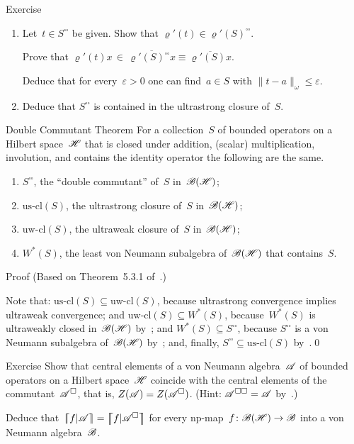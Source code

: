 \documentclass[a]{subfiles}
\begin{document}
\begin{parsec}
\begin{point}{Exercise}
\begin{point}
\begin{enumerate}
\item
Let~$t\in S^{\square\square}$ be given.
Show that $\varrho'(t)\in \varrho'(S)^{\square\square}$.

Prove that  $\varrho'(t)x\,\in\,\overline{\varrho'(S)^{\square\square}x}
\equiv \overline{\varrho'(S)x}$.

Deduce
that for every~$\varepsilon>0$
one can find~$a\in S$ with $\|t-a\|_\omega \leq \varepsilon$.

\item
Deduce that $S^{\square\square}$
is contained in the ultrastrong closure of~$S$.
\end{enumerate}
\end{point}
\end{point}
\begin{point}{Double Commutant Theorem}%
For a collection~$S$ of bounded operators
on a Hilbert space~$\mathscr{H}$
that is closed under addition, (scalar) multiplication,
involution, and contains the identity operator
the following are the same.
\begin{enumerate}
\item
$S^{\square\square}$, the ``double commutant'' of~$S$
in~$\mathscr{B}(\mathscr{H})$;
\item
$\mathrm{us}\text{-}\mathrm{cl}(S)$,
the ultrastrong closure of~$S$ in~$\mathscr{B}(\mathscr{H})$;
\item
$\mathrm{uw}\text{-}\mathrm{cl}(S)$,
the ultraweak closure of~$S$ in~$\mathscr{B}(\mathscr{H})$;
\item
$W^*(S)$,
the least von Neumann subalgebra of~$\mathscr{B}(\mathscr{H})$
that contains~$S$.
\end{enumerate}
\begin{point}{Proof}%
(Based on Theorem~5.3.1 of~\cite{kr}.) 

Note that: $\mathrm{us}\text{-}\mathrm{cl}(S)
\subseteq  \mathrm{uw}\text{-}\mathrm{cl}(S)$,
because ultrastrong convergence implies ultraweak convergence;
and
$\mathrm{uw}\text{-}\mathrm{cl}(S)
\subseteq W^*(S)$,
because~$W^*(S)$ 
is ultraweakly closed in~$\mathscr{B}(\mathscr{H})$ by~;
and
$W^*(S)\subseteq S^{\square\square}$,
because 
$S^{\square\square}$ is a von Neumann subalgebra
of~$\mathscr{B}(\mathscr{H})$ by~;
and, finally, $S^{\square\square}\subseteq \mathrm{us}\text{-}\mathrm{cl}(S)$
by~.\qed
\end{point}
\end{point}
\begin{point}{Exercise}
Show that central elements of
a von Neumann algebra~$\mathscr{A}$
of bounded operators on a Hilbert space~$\mathscr{H}$
coincide with the central elements of the commutant~$\mathscr{A}^\square$,
that is, $Z(\mathscr{A})=Z(\mathscr{A}^\square)$.
(Hint: $\mathscr{A}^{\square\square}=\mathscr{A}$ by~.)
\begin{point}%
Deduce that~$\cceil{f|\scrA}=\cceil{f|\scrA^\square}$
for every np-map~$f\colon \mathscr{B}(\mathscr{H})\to\mathscr{B}$ 
into a von Neumann algebra~$\mathscr{B}$.
\end{point}
\end{point}
\end{parsec}%
\end{document}
